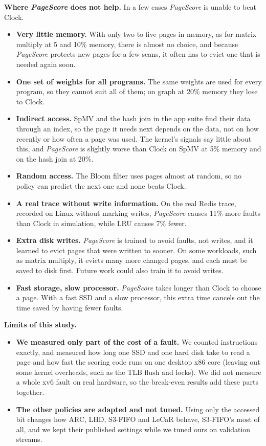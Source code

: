 \documentclass{article}
\newcommand{\clock}{Clock\xspace}
\DeclareRobustCommand{\pagescore}{\textit{PageScore}}
\newcommand{\finding}[1]{\textbf{#1}\hspace{0.4em}}
\begin{document}
\finding{Where \pagescore{} does not help.}\label{sec:eval-loss} In a few cases \pagescore{} is unable to beat \clock.
\begin{itemize}[topsep=3pt, itemsep=2pt, parsep=0pt]
\item \textbf{Very little memory.} With only two to five pages in memory, as for matrix multiply at 5 and 10\% memory, there is almost no choice, and because \pagescore{} protects new pages for a few scans, it often has to evict one that is needed again soon.
\item \textbf{One set of weights for all programs.} The same weights are used for every program, so they cannot suit all of them; on graph at 20\% memory they lose to \clock.
\item \textbf{Indirect access.} SpMV and the hash join in the app suite find their data through an index, so the page it needs next depends on the data, not on how recently or how often a page was used. The kernel's signals say little about this, and \pagescore{} is slightly worse than \clock on SpMV at 5\% memory and on the hash join at 20\%.
\item \textbf{Random access.} The Bloom filter uses pages almost at random, so no policy can predict the next one and none beats \clock.
\item \textbf{A real trace without write information.} On the real Redis trace, recorded on Linux without marking writes, \pagescore{} causes 11\% more faults than \clock in simulation, while LRU causes 7\% fewer.
\item \textbf{Extra disk writes.} \pagescore{} is trained to avoid faults, not writes, and it learned to evict pages that were written to sooner. On some workloads, such as matrix multiply, it evicts many more changed pages, and each must be saved to disk first. Future work could also train it to avoid writes.
\item \textbf{Fast storage, slow processor.} \pagescore{} takes longer than \clock to choose a page. With a fast SSD and a slow processor, this extra time cancels out the time saved by having fewer faults.
\end{itemize}

\finding{Limits of this study.}
\begin{itemize}[topsep=3pt, itemsep=2pt, parsep=0pt]
\item \textbf{We measured only part of the cost of a fault.} We counted instructions exactly, and measured how long one SSD and one hard disk take to read a page and how fast the scoring code runs on one desktop x86 core (leaving out some kernel overheads, such as the TLB flush and locks). We did not measure a whole xv6 fault on real hardware, so the break-even results add these parts together.
\item \textbf{The other policies are adapted and not tuned.} Using only the accessed bit changes how ARC, LHD, S3-FIFO and LeCaR behave, S3-FIFO's most of all, and we kept their published settings while we tuned ours on validation streams.
\end{itemize}
\end{document}
